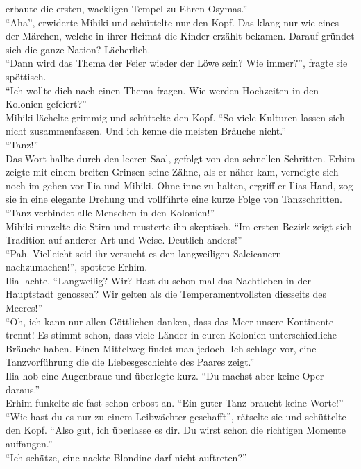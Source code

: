 erbaute die ersten, wackligen Tempel zu Ehren Osymas.''\\
``Aha'', erwiderte Mihiki und schüttelte nur den Kopf. Das klang nur wie eines der Märchen, welche 
in ihrer Heimat die Kinder erzählt bekamen. Darauf gründet sich die ganze Nation? Lächerlich.\\
``Dann wird das Thema der Feier wieder der Löwe sein? Wie immer?'', fragte sie spöttisch.\\
``Ich wollte dich nach einen Thema fragen. Wie werden Hochzeiten in den Kolonien gefeiert?''\\
Mihiki lächelte grimmig und schüttelte den Kopf. ``So viele Kulturen lassen sich nicht 
zusammenfassen. Und ich kenne die meisten Bräuche nicht.''\\
``Tanz!''\\
Das Wort hallte durch den leeren Saal, gefolgt von den schnellen Schritten. Erhim zeigte mit einem 
breiten Grinsen seine Zähne, als er näher kam, verneigte sich noch im gehen vor Ilia und Mihiki. 
Ohne inne zu halten, ergriff er Ilias Hand, zog sie in eine elegante Drehung und vollführte eine 
kurze Folge von Tanzschritten. ``Tanz verbindet alle Menschen in den Kolonien!''\\
Mihiki runzelte die Stirn und musterte ihn skeptisch. ``Im ersten Bezirk zeigt sich Tradition auf 
anderer Art und Weise. Deutlich anders!''\\
``Pah. Vielleicht seid ihr versucht es den langweiligen Saleicanern nachzumachen!'', spottete 
Erhim.\\
Ilia lachte. ``Langweilig? Wir? Hast du schon mal das Nachtleben in der Hauptstadt genossen? Wir 
gelten als die Temperamentvollsten diesseits des Meeres!''\\
``Oh, ich kann nur allen Göttlichen danken, dass das Meer unsere Kontinente trennt! Es stimmt 
schon, dass viele Länder in euren Kolonien unterschiedliche Bräuche haben. Einen Mittelweg findet 
man jedoch. Ich schlage vor, eine Tanzvorführung die die Liebesgeschichte des Paares zeigt.''\\
Ilia hob eine Augenbraue und überlegte kurz. ``Du machst aber keine Oper daraus.''\\
Erhim funkelte sie fast schon erbost an. ``Ein guter Tanz braucht keine Worte!''\\
``Wie hast du es nur zu einem Leibwächter geschafft'', rätselte sie und schüttelte den Kopf. ``Also 
gut, ich überlasse es dir. Du wirst schon die richtigen Momente auffangen.''\\
``Ich schätze, eine nackte Blondine darf nicht auftreten?''\\
